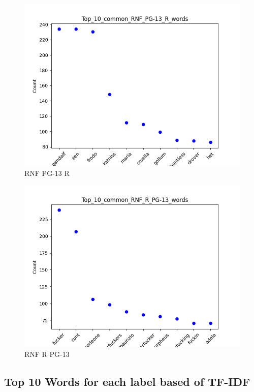 \documentclass[a4paper]{article}
\begin{document}
\begin{figure}[ht]
    \centering
    \includegraphics[width=1\textwidth]{../stats/Top_10_common_RNF_PG-13_R_words.png}
    \caption{RNF PG-13 R}
\end{figure}


\begin{figure}[ht]
    \centering
    \includegraphics[width=1\textwidth]{../stats/Top_10_common_RNF_R_PG-13_words.png}
    \caption{RNF R PG-13}
\end{figure}


\FloatBarrier

\subsection*{Top 10 Words for each label based of TF-IDF}
\end{document}

